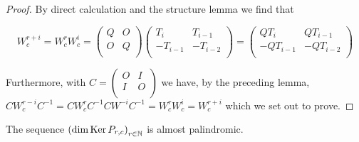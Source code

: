 \begin{proof}
  By direct calculation and the structure lemma we find that

  \[
  W_{c}^{r+i}
  =
  W_{c}^{r}W_{c}^{i}
  =
  \left(
  \begin{array}{cc}
    Q & O \\
    O & Q \\
  \end{array}
  \right)
  \left(
  \begin{array}{cc}
     T_{i} &  T_{i-1}  \\
    -T_{i-1} & -T_{i-2} \\
  \end{array}
  \right)
  =
  \left(
  \begin{array}{cc}
     QT_{i} &  QT_{i-1}  \\
    -QT_{i-1} & -QT_{i-2} \\
  \end{array}
  \right)
  \]

  Furthermore, with $C=\left(\begin{smallmatrix} O & I \\ I & O \\\end{smallmatrix}\right)$
  we have, by the preceding lemma,
  $CW_{c}^{r-i}C^{-1}=CW_{c}^{r}C^{-1}CW^{-i}C^{-1}=W_{c}^{r}W_{c}^{i}=W_{c}^{r+i}$
  which we set out to prove.
\end{proof}

\begin{theorem}
  The sequence $\left(\dim\operatorname{Ker} P_{r,c}\right)_{r\in\mathbb{N}}$
  is almost palindromic.
\end{theorem}


